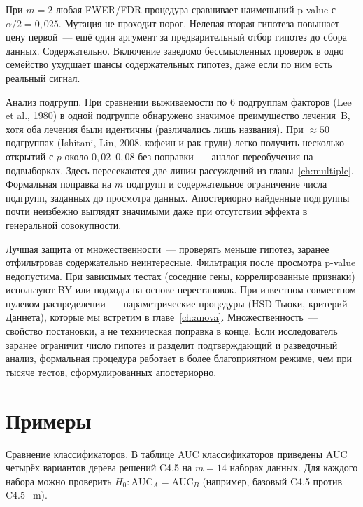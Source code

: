 При $m=2$ любая FWER/FDR-процедура сравнивает наименьший p-value с $\alpha/2=0{,}025$. Мутация не проходит порог. Нелепая вторая гипотеза повышает цену первой~--- ещё один аргумент за предварительный отбор гипотез до сбора данных.
Содержательно. Включение заведомо бессмысленных проверок в одно семейство ухудшает шансы содержательных гипотез, даже если по ним есть реальный сигнал.

Анализ подгрупп. При сравнении выживаемости по $6$ подгруппам факторов (Lee et al., 1980) в одной подгруппе обнаружено значимое преимущество лечения~B, хотя оба лечения были идентичны (различались лишь названия).
При $\approx 50$ подгруппах (Ishitani, Lin, 2008, кофеин и рак груди) легко получить несколько открытий с $p$ около $0{,}02$--$0{,}08$ без поправки~--- аналог переобучения на подвыборках.
Здесь пересекаются две линии рассуждений из главы~\ref{ch:multiple}. Формальная поправка на $m$ подгрупп и содержательное ограничение числа подгрупп, заданных до просмотра данных.
Апостериорно найденные подгруппы почти неизбежно выглядят значимыми даже при отсутствии эффекта в генеральной совокупности.

Лучшая защита от множественности~--- проверять меньше гипотез, заранее отфильтровав содержательно неинтересные. Фильтрация после просмотра p-value недопустима.
При зависимых тестах (соседние гены, коррелированные признаки) используют BY или подходы на основе перестановок. При известном совместном нулевом распределении~--- параметрические процедуры (HSD Тьюки, критерий Даннета), которые мы встретим в главе~\ref{ch:anova}.
Множественность~--- свойство постановки, а не техническая поправка в конце. Если исследователь заранее ограничит число гипотез и разделит подтверждающий и разведочный анализ, формальная процедура работает в более благоприятном режиме, чем при тысяче тестов, сформулированных апостериорно.

\section{Примеры}
\label{sec:examples}

Сравнение классификаторов. В таблице AUC классификаторов приведены AUC четырёх вариантов дерева решений C4.5 на $m=14$ наборах данных.
Для каждого набора можно проверить $H_0\colon \text{AUC}_A=\text{AUC}_B$ (например, базовый C4.5 против C4.5+m).

